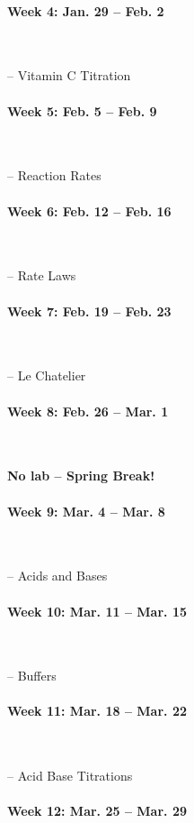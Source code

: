 \documentclass[12pt, letterpaper]{article}
\begin{document}
\paragraph{Week 4: Jan. 29 -- Feb. 2}~

-- Vitamin C Titration

\paragraph{Week 5: Feb. 5 -- Feb. 9}~

-- Reaction Rates

\paragraph{Week 6: Feb. 12 -- Feb. 16}~

-- Rate Laws

\paragraph{Week 7: Feb. 19 -- Feb. 23}~

-- Le Chatelier

\paragraph{Week 8: Feb. 26 -- Mar. 1}~

\textbf{No lab -- Spring Break!}

\paragraph{Week 9: Mar. 4 -- Mar. 8}~

-- Acids and Bases

\paragraph{Week 10: Mar. 11 -- Mar. 15}~

-- Buffers

\paragraph{Week 11: Mar. 18 -- Mar. 22}~

-- Acid Base Titrations

\paragraph{Week 12: Mar. 25 -- Mar. 29}~
\end{document}
